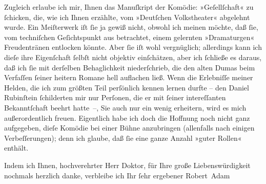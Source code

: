 \pstart
           Zugleich erlaube ich mir, Ihnen das Manuſkript der Komödie: »Geſellſchaft« zu{ }ſchicken, die, wie ich Ihnen erzählte, vom »Deutſchen Volkstheater« abgelehnt wurde. Ein
               Meiſterwerk iſt{ }ſie ja gewiß nicht, obwohl ich meinen möchte, daß{ }ſie, vom
               techniſchen Geſichtspunkt aus betrachtet, einem gelernten »Dramaturgen« Freudentränen
               entlocken könnte. Aber ſie iſt {\pb}wohl
               vergnüglich; allerdings kann ich dieſe ihre Eigenſchaft{ }ſelbſt nicht objektiv
               einſchätzen, aber ich{ }ſchließe es daraus, daß ich{ }ſie mit derſelben Behaglichkeit
               niederſchrieb, die den alten Dumas beim
               Verfaſſen{ }ſeiner heitern Romane hell auflachen ließ. Wenn die Erlebniſſe meiner
               Helden, die ich zum größten Teil perſönlich kennen lernen durfte – den Daniel
               Rubinſtein{ }ſchilderten mir nur Perſonen, die er mit{ }ſeiner intereſſanten
               Bekanntſchaft beehrt hatte –, Sie auch nur ein wenig erheitern, wird es mich
               außerordentlich freuen. Eigentlich habe ich doch die Hoffnung noch nicht ganz
               aufgegeben, dieſe Komödie bei einer Bühne anzubringen (allenfalls nach einigen
               Verbeſſerungen); denn ich glaube, daß{ }ſie eine ganze Anzahl »guter Rollen«
               enthält.\pend
           
\pstart
           Indem ich Ihnen, hochverehrter Herr Doktor, für Ihre große Liebenswürdigkeit nochmals
               herzlich danke, verbleibe ich Ihr{ }ſehr ergebener\pend
           \pstart \spacefill\mbox{Robert Adam}\pend{}\endnumbering{}  \newcommand{\dateiname}{L02209}\newcommand{\titel}{Robert Adam an Arthur Schnitzler, 22. 6. 1915}\newcommand{\editorInnen}{Martin Anton Müller und Gerd-Hermann Susen}
